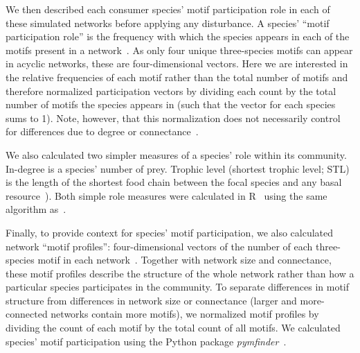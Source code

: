 \documentclass[12pt]{article}
\begin{document}
\begin{spacing}{2.0}
        
        We then described each consumer species' motif participation role in each of these simulated networks before applying any disturbance. 
        A species' ``motif participation role'' is the frequency with which the species appears in each of the motifs present in a network~\citep{Stouffer2012}.
        As only four unique three-species motifs can appear in acyclic networks, these are four-dimensional vectors. 
        Here we are interested in the relative frequencies of each motif rather than the total number of motifs and therefore normalized participation vectors by dividing each count by the total number of motifs the species appears in (such that the vector for each species sums to 1).
        Note, however, that this normalization does not necessarily control for differences due to degree or connectance~\citep{Cirtwill2022Oikos}. 


        We also calculated two simpler measures of a species' role within its community.
        In-degree is a species' number of prey.
        Trophic level (shortest trophic level; STL) is the length of the shortest food chain between the focal species and any basal resource~\citep{Williams2004}).
        Both simple role measures were calculated in R~\citep{R} using the same algorithm as~\citet{Eklof2013}.

        
        Finally, to provide context for species' motif participation, we also calculated network ``motif profiles'': four-dimensional vectors of the number of each three-species motif in each network~\citep{Stouffer2012}.
        Together with network size and connectance, these motif profiles describe the structure of the whole network rather than how a particular species participates in the community.
        To separate differences in motif structure from differences in network size or connectance (larger and more-connected networks contain more motifs), we normalized motif profiles by dividing the count of each motif by the total count of all motifs. 
        We calculated species' motif participation using the Python package \emph{pymfinder}~\citep{pymfinder}.



    
    

\end{spacing}
\end{document}
